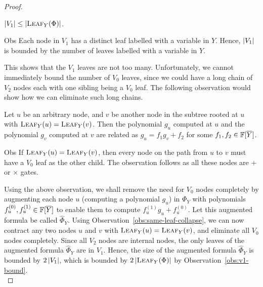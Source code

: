 \documentclass{birkjour}
\providecommand{\DIFaddtex}[1]{{\protect\color{blue}\uwave{#1}}} %
\providecommand{\DIFdeltex}[1]{{\protect\color{red}\sout{#1}}}                      %
\providecommand{\DIFaddbegin}{} %
\providecommand{\DIFaddend}{} %
\providecommand{\DIFdelbegin}{} %
\providecommand{\DIFdelend}{} %
\providecommand{\DIFadd}[1]{\texorpdfstring{\DIFaddtex{#1}}{#1}} %
\providecommand{\DIFdel}[1]{\texorpdfstring{\DIFdeltex{#1}}{}} %
\begin{document}
\begin{proof}
  \begin{observation}\label{obs:v1-bound}$\left|V_1\right| \leq \left|\textsc{Leaf}_Y(\Phi)\right|$.    
  \end{observation}
  \begin{myproof}{Obs}
    Each node in $V_1$ has a distinct leaf labelled with a variable in
    $Y$. Hence, $\left|V_1\right|$ is bounded by the number of leaves
    labelled with a variable in $Y$.
  \end{myproof}

  This shows that the $V_1$ leaves are not too many. Unfortunately, we
  cannot immediately bound the number of $V_0$ leaves, since we could
  have a long chain of $V_2$ nodes each with one sibling being a $V_0$
  leaf. The following observation would show how we can eliminate such
  long chains.

  \begin{observation}\label{obs:same-leaf-collapse}
    Let $u$ be an arbitrary node, and $v$ be another node in the
    subtree rooted at $u$ with $\textsc{Leaf}_Y(u) =
    \textsc{Leaf}_Y(v)$. Then the polynomial $g_u$ computed at $u$ and
    the polynomial $g_v$ computed at $v$ are related as $g_u = f_1 g_v
    + f_2$ for some \DIFdelbegin \DIFdel{$f_1,f_2 \in \mathbb{F}[\overline{Y}]$}\DIFdelend \DIFaddbegin \DIFadd{$f_1,f_2 \in \F[X\setminus Y]$}\DIFaddend .
  \end{observation}
  \begin{myproof}{Obs}
    If $\textsc{Leaf}_Y(u) =\textsc{Leaf}_Y(v)$, then every node on
    the path from $u$ to $v$ must have a $V_0$ leaf as the other child. The
    observation follows as all these nodes are $+$ or $\times$ gates.
  \end{myproof}

  Using the above observation, we shall remove the need for $V_0$
  nodes completely by augmenting each node $u$ (computing a polynomial
  $g_u$) in $\Phi_Y$ with polynomials \DIFdelbegin \DIFdel{$f_u^{(0)}, f_u^{(1)} \in \mathbb{F}[\overline{Y}]$
  }\DIFdelend \DIFaddbegin \DIFadd{$f_u^{(0)}, f_u^{(1)} \in \F[X\setminus Y]$
  }\DIFaddend to enable them to compute $f_u^{(1)}g_u + f_u^{(0)}$. Let this augmented formula be called $\hat{\Phi}_Y$. Using
  Observation~\ref{obs:same-leaf-collapse}, we can now contract any
  two nodes $u$ and $v$ with $\textsc{Leaf}_Y(u) =
  \textsc{Leaf}_Y(v)$, and eliminate all $V_0$ nodes
  completely. Since all $V_2$ nodes are internal nodes, the only leaves of the augmented formula $\hat{\Phi}_Y$ are in $V_1$. Hence, the size of the augmented formula $\hat{\Phi}_Y$ is  bounded by $2\left|V_1\right|$, which is bounded by
  $2\left|\textsc{Leaf}_Y(\Phi)\right|$ by Observation~\ref{obs:v1-bound}.\\


\end{proof}
\end{document}
